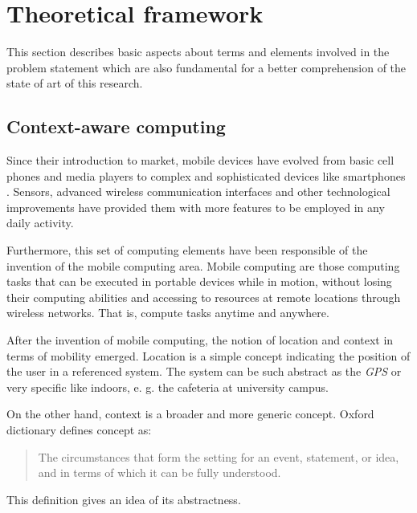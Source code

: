 \section{Theoretical framework} 
\label{sec:theoretical_framework}

This section describes basic aspects about terms and elements involved in the problem statement which are also fundamental for a better comprehension of the state of art of this research.

\subsection{Context-aware computing}
\label{sub:context_aware_computing}

Since their introduction to market, mobile devices have evolved from basic cell phones and media players to complex and sophisticated devices like smartphones \cite{Charlesworth2009,Schmidt2011}.
Sensors, advanced wireless communication interfaces and other technological improvements have provided them with more features to be employed in any daily activity.

Furthermore, this set of computing elements have been responsible of the invention of the mobile computing area.
Mobile computing are those computing tasks that can be executed in portable devices while in motion, without losing their computing abilities and accessing to resources at remote locations through wireless networks.
That is, compute tasks anytime and anywhere.

After the invention of mobile computing, the notion of location and context in terms of mobility emerged. 
Location is a simple concept indicating the position of the user in a referenced system. 
The system can be such abstract as the \emph{GPS} or very specific like indoors, e. g. the cafeteria at university campus.

On the other hand, context is a broader and more generic concept.
Oxford dictionary defines concept as:
\begin{quotation}
  The circumstances that form the setting for an event, statement, or idea, and in terms of which it can be fully understood.
\end{quotation}
This definition gives an idea of its abstractness.

